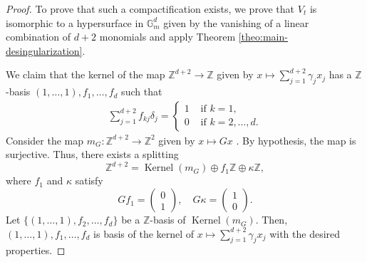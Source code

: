 \documentclass[11pt, reqno]{amsart}
\theoremstyle{plain}
\theoremstyle{definition}
\newcommand{\Z}{\mathbb{Z}}
\newcommand{\ga}{\gamma}
\newcommand{\G}{\mathbb{G}}
\begin{document}
\begin{proof}
To prove that such a compactification exists, we prove that $V_t$ is isomorphic to a hypersurface in $\G_m^{d}$ given by the vanishing of a linear combination of $d+2$ monomials and apply Theorem \ref{theo:main-desingularization}.

We claim that the kernel of the map $\Z^{d+2} \to \Z$  given by $x \mapsto \sum_{j=1}^{d+2} \ga_j x_j$ has a $\Z$-basis  $(1,\dots,1), f_1 ,\dots, f_{d}$ such that  
\begin{align}
    \sum_{j=1}^{d+2} f_{kj} \delta_j = \begin{cases}
        1 & \text{ if } k=1, \\
        0 & \text{ if } k=2, \dots, d.
    \end{cases}
\end{align}
Consider the map $m_G :\Z^{d+2} \to \Z^2$ given by $x \mapsto G  x$ . 
By hypothesis, the map is surjective. Thus, there exists a splitting
\[
\Z^{d+2} = \operatorname{Kernel} (m_G) \oplus f_1 \Z \oplus \kappa \Z,
\]
where $f_1 $ and $\kappa$ satisfy
\[
G f_1 = \begin{pmatrix}
        0 \\
        1
\end{pmatrix}, \quad G \kappa = \begin{pmatrix}
        1 \\
        0
\end{pmatrix}.
\]
Let $\{(1, \dots ,1), f_2, \dots,f_d \}$ be a $\Z$-basis of $\operatorname{Kernel}(m_G)$. Then, $(1,\dots,1), f_1, \dots, f_d$ is basis of the kernel of $x \mapsto \sum_{j=1}^{d+2} \ga_j x_j$ with the desired properties. 


\end{proof}
\end{document}
